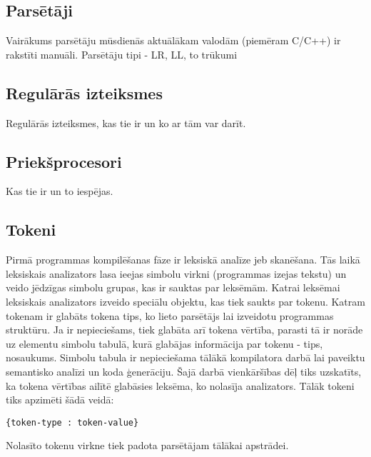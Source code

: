 \subsection{Parsētāji}
Vairākums parsētāju mūsdienās aktuālākam valodām (piemēram C/C++) ir rakstīti manuāli. 
Parsētāju tipi - LR, LL, to trūkumi

\subsection{Regulārās izteiksmes}
Regulārās izteiksmes, kas tie ir un ko ar tām var darīt.

\subsection{Priekšprocesori}
Kas tie ir un to iespējas.

\subsection{Tokeni}
Pirmā programmas kompilēšanas fāze ir leksiskā analīze jeb skanēšana. Tās laikā leksiskais analizators lasa ieejas simbolu virkni (programmas izejas tekstu) un veido jēdzīgas simbolu grupas, kas ir sauktas par leksēmām. Katrai leksēmai leksiskais analizators izveido speciālu objektu, kas tiek saukts par tokenu. Katram tokenam ir glabāts tokena tips, ko lieto parsētājs lai izveidotu programmas struktūru. Ja ir nepieciešams, tiek glabāta arī tokena vērtība, parasti tā ir norāde uz elementu simbolu tabulā, kurā glabājas informācija par tokenu - tips, nosaukums. Simbolu tabula ir nepieciešama tālākā kompilatora darbā lai paveiktu semantisko analīzi un koda ģenerāciju. Šajā darbā vienkāršības dēļ tiks uzskatīts, ka tokena vērtības ailītē glabāsies   leksēma, ko nolasīja analizators. Tālāk tokeni tiks apzimēti šādā veidā:
\begin{verbatim}
{token-type : token-value}
\end{verbatim}

Nolasīto tokenu virkne tiek padota parsētājam tālākai apstrādei.

